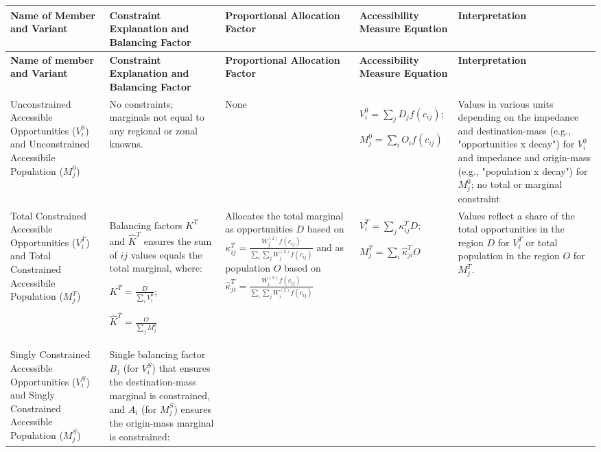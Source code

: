 {\tiny
\begin{longtable}{|p{2.5cm}|p{2.5cm}|p{2.5cm}|p{3cm}|p{3cm}|}
\hline
\textbf{Name of Member and Variant} & \textbf{Constraint Explanation and Balancing Factor} & \textbf{Proportional Allocation Factor} & \textbf{Accessibility Measure Equation} & \textbf{Interpretation} \\
\hline
\endfirsthead

\hline
\textbf{Name of member and Variant} & \textbf{Constraint Explanation and Balancing Factor} & \textbf{Proportional Allocation Factor} & \textbf{Accessibility Measure Equation} & \textbf{Interpretation} \\
\hline
\endhead

Unconstrained Accessible Opportunities ($V_i^0$) and Unconstrained Accessibile Population ($M_j^0$)
& No constraints; marginals not equal to any regional or zonal knowns.
& None
& $V_i^0 = \sum_j D_j f(c_{ij})$;

$M_j^0 = \sum_i O_i f(c_{ij})$

& Values in various units depending on the impedance and destination-mass (e.g., "opportunities x decay") for $V_i^0$ and impedance and origin-mass (e.g., "population x decay") for $M_j^0$; no total or marginal constraint \\
\hline

Total Constrained Accessible Opportunities ($V_i^T$) and Total Constrained Accessibile Population ($M_j^T$)
& Balancing factors $K^T$ and $\hat{K}^T$ ensures the sum of $ij$ values equals the total marginal, where:

$K^T = \frac{D}{\sum_i V_i^0}$;

$\hat{K}^T = \frac{O}{\sum_j M_j^0}$

& Allocates the total marginal as opportunities $D$ based on $\kappa_{ij}^T = \frac{W^{(2)}_j f(c_{ij})}{\sum_i\sum_j W^{(2)}_jf(c_{ij})}$ and as population $O$ based on $\hat \kappa_{ji}^T = \frac{W^{(2)}_i  f(c_{ij})}{\sum_i\sum_j W^{(2)}_if(c_{ij})}$

& $V^T_i =  \sum_j \kappa_{ij}^T D$;

$M_j^T =  \sum_i \hat{\kappa}_{ji}^T O$


& Values reflect a share of the total opportunities in the region $D$ for $V^T_i$ or total population in the region $O$ for $M^T_j$. \\
\hline

Singly Constrained Accessible Opportunities ($V_i^S$) and Singly Constrained Accessible Population ($M_j^S$)
& Single balancing factor $B_j$ (for $V_i^S$) that ensures the destination-mass marginal is constrained, and $A_i$ (for $M_j^S$) ensures the origin-mass marginal is constrained:


\end{longtable}}
